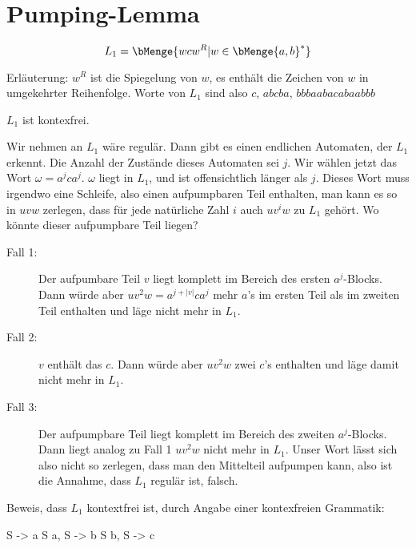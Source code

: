 \documentclass{bschlangaul-aufgabe}
\begin{document}
\section{Pumping-Lemma
}


\begin{liExkurs}
\bPumpingRegulaer
\end{liExkurs}

\begin{displaymath}
L_1 = \bMenge{ w c w^R | w \in \bMenge{a, b}^* }
\end{displaymath}

\noindent
Erläuterung: $w^R$ ist die Spiegelung von $w$, \dh es enthält die
Zeichen von $w$ in umgekehrter Reihenfolge. Worte von $L_1$ sind also
\zB $c$, $abcba$, $bbbaabacabaabbb$

\begin{liAntwort}
$L_1$ ist kontexfrei.


\noindent
Wir nehmen an $L_1$ wäre regulär. Dann gibt es einen endlichen
Automaten, der $L_1$ erkennt. Die Anzahl der Zustände dieses Automaten
sei $j$. Wir wählen jetzt das Wort $\omega = a^j c a^j$. $\omega$ liegt
in $L_1$, und ist offensichtlich länger als $j$. Dieses Wort muss
irgendwo eine Schleife, also einen aufpumpbaren Teil enthalten, \dh
man kann es so in $uvw$ zerlegen, dass für jede natürliche Zahl $i$ auch
$uv^iw$ zu $L_1$ gehört. Wo könnte dieser aufpumpbare Teil liegen?

\begin{description}
\item[Fall 1:]

Der aufpumbare Teil $v$ liegt komplett im Bereich des ersten
$a^j$-Blocks. Dann würde aber $uv^2w = a^{j + |v|} c a^j$ mehr $a$’s im
ersten Teil als im zweiten Teil enthalten und läge nicht mehr in $L_1$.

\item[Fall 2:]

$v$ enthält das $c$. Dann würde aber $u v^2 w$ zwei $c$’s enthalten und
läge damit nicht mehr in $L_1$.

\item[Fall 3:]

Der aufpumpbare Teil liegt komplett im Bereich des zweiten $a^j$-Blocks.
Dann liegt analog zu Fall 1 $u v^2 w$ nicht mehr in $L_1$. Unser Wort
lässt sich also nicht so zerlegen, dass man den Mittelteil aufpumpen
kann, also ist die Annahme, dass $L_1$ regulär ist, falsch.
\end{description}
\noindent
Beweis, dass $L_1$ kontextfrei ist, durch Angabe einer kontexfreien
Grammatik:

\noindent
\begin{liProduktionsRegeln}
S -> a S a,
S -> b S b,
S -> c
\end{liProduktionsRegeln}
\end{liAntwort}
\end{document}
